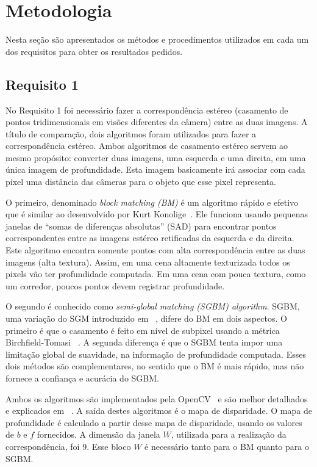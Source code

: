 \documentclass{bmvc2k}
\begin{document}
\section{Metodologia}
\label{sec:Methods}
Nesta seção são apresentados os métodos e procedimentos utilizados em cada um dos requisitos para obter os resultados pedidos.
\subsection{Requisito 1}
\label{req1}
No Requisito 1 foi necessário fazer a correspondência estéreo (casamento de pontos tridimensionais em visões diferentes da câmera) entre as duas imagens. A título de comparação, dois algoritmos foram utilizados para fazer a correspondência estéreo. Ambos algoritmos de casamento estéreo servem ao mesmo propósito: converter duas imagens, uma esquerda e uma direita, em uma única imagem de profundidade. Esta imagem basicamente irá associar com cada pixel uma distância das câmeras para o objeto que esse pixel representa.  

O primeiro, denominado \textit{block matching (BM)} é um algoritmo rápido e efetivo que é similar ao desenvolvido por Kurt Konolige~\cite{kurt}. Ele funciona usando pequenas janelas de ``somas de diferenças absolutas'' (SAD) para encontrar pontos correspondentes entre as imagens estéreo retificadas da esquerda e da direita. Este algoritmo encontra somente pontos com alta correspondência entre as duas imagens (alta textura). Assim, em uma cena altamente texturizada todos os pixels vão ter profundidade computada. Em uma cena com pouca textura, como um corredor, poucos pontos devem registrar profundidade. 

O segundo é conhecido como \textit{semi-global matching (SGBM) algorithm}. SGBM, uma variação do SGM introduzido em ~\cite{hirschmullerstereo}, difere do BM em dois aspectos. O primeiro é que o casamento é feito em nível de subpixel usando a métrica Birchfield-Tomasi ~\cite{birchfield1999depth}. A segunda diferença é que o SGBM tenta impor uma limitação global de suavidade, na informação de profundidade computada. Esses dois métodos são complementares, no sentido que o BM é mais rápido, mas não fornece a confiança e acurácia do SGBM.

Ambos os algoritmos são implementados pela OpenCV~\cite{OpenCV} e são melhor detalhados e explicados em ~\cite{kaehler2016learning}. A saída destes algoritmos é o mapa de disparidade. O mapa de profundidade é calculado a partir desse mapa de disparidade, usando os valores de $b$ e $f$ fornecidos. A dimensão da janela $W$, utilizada para a realização da correspondência, foi 9. Esse bloco $W$ é necessário tanto para o BM quanto para o SGBM.
\end{document}
